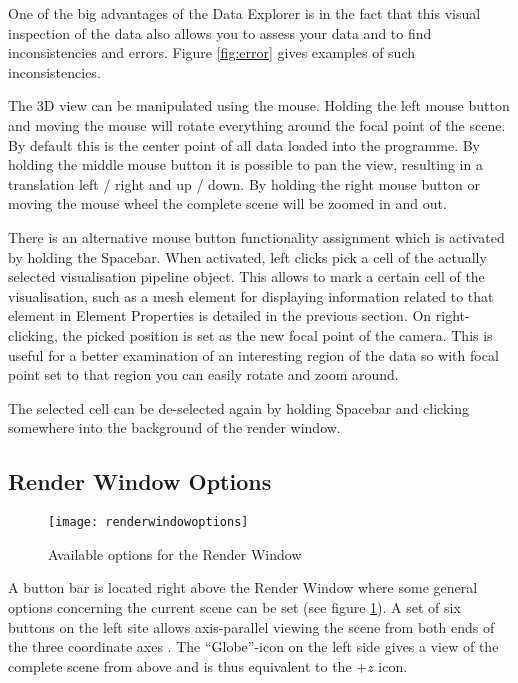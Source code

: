 One of the big advantages of the Data Explorer is in the fact that this visual inspection of the data also allows you to assess your data and to find inconsistencies and errors. Figure \ref{fig:error} gives examples of such inconsistencies.

The 3D view can be manipulated using the mouse. Holding the left mouse button and moving the mouse will rotate everything around the focal point of the scene. By default this is the center point of all data loaded into the programme. By holding the middle mouse button it is possible to pan the view, resulting in a translation left / right and up / down. By holding the right mouse button or moving the mouse wheel the complete scene will be zoomed in and out.

There is an alternative mouse button functionality assignment which is activated by holding the Spacebar. When activated, left clicks pick a cell of the actually selected visualisation pipeline object. This allows to mark a certain cell of the visualisation, such as a mesh element for displaying information related to that element in Element Properties is detailed in the previous section. On right-clicking, the picked position is set as the new focal point of the camera. This is useful for a better examination of an interesting region of the data so with focal point set to that region you can easily rotate and zoom around.

The selected cell can be de-selected again by holding Spacebar and clicking somewhere into the background of the render window.

\subsection{Render Window Options}

\begin{figure}[tb]
\begin{center}
\texttt{[image: renderwindowoptions]}
\caption{Available options for the Render Window}
\label{fig:renderoptions}
\end{center}
\end{figure}

A button bar is located right above the Render Window where some general options concerning the current scene can be set (see figure \ref{fig:renderoptions}). A set of six buttons on the left site allows axis-parallel viewing the scene from both ends of the three coordinate axes . The ``Globe''-icon on the left side gives a view of the complete scene from above and is thus equivalent to the $+z$ icon.

